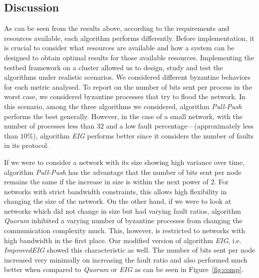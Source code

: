 ﻿\subsection{Discussion}


As can be seen from the results above, according to the requirements and
resources available, each algorithm performs differently. Before
implementation, it is crucial to consider what resources are available and how
a system can be designed to obtain optimal results for those available
resources. Implementing the testbed framework on a cluster allowed us to
design, study and test the algorithms under realistic scenarios. We considered
different byzantine behaviors for each metric analysed. To report on the number of
bits sent per process in the worst case, we considered byzantine processes that
try to flood the network. In this scenario, among the three algorithms we
considered, algorithm \textit{Pull-Push} performs the best generally. However,
in the case of a small network, with the number of processes less than $32$ and
a low fault percentage---(approximately less than $10\%$), algorithm
\textit{EIG} performs better since it considers the number of faults in its
protocol. 

If we were to consider a network with its size showing high variance over time,
algorithm \textit{Pull-Push} has the advantage that the number of bits sent per
node remains the same if the increase in size is within the next power of $2$.
For networks with strict bandwidth constraints, this allows high flexibility in
changing the size of the network. On the other hand, if we were to look at
networks which did not change in size but had varying fault ratios, algorithm
\textit{Quorum} inhibited a varying number of byzantine processes from changing
the communication complexity much. This, however, is restricted to networks
with high bandwidth in the first place. Our modified version of algorithm
\textit{EIG}, i.e. \textit{ImprovedEIG} showed this characteristic as well. The
number of bits sent per node increased very minimally on increasing the fault
ratio and also performed much better when compared to \textit{Quorum} or
\textit{EIG} as can be seen in Figure~\ref{fig:comp}.


